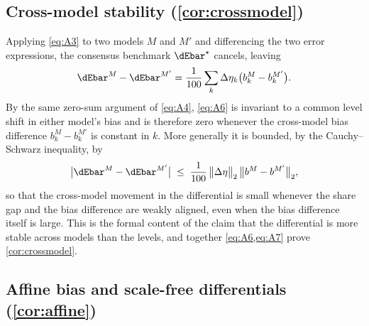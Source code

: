 \subsection{Cross-model stability (\texorpdfstring{\cref{cor:crossmodel}}{Corollary 1})}

Applying \cref{eq:A3} to two models $M$ and $M'$ and differencing the two error expressions, the consensus benchmark $\dEbar^{\star}$ cancels, leaving
\begin{equation}\label{eq:A6}
\dEbar^{M} - \dEbar^{M'}
= \frac{1}{100} \sum_k \Delta\eta_k
\bigl(b^{M}_k - b^{M'}_k\bigr) .
\end{equation}
By the same zero-sum argument of \cref{eq:A4}, \cref{eq:A6} is invariant to a common level shift in either model's bias and is therefore zero whenever the cross-model bias difference $b^{M}_k - b^{M'}_k$ is constant in $k$. More generally it is bounded, by the Cauchy--Schwarz inequality, by
\begin{equation}\label{eq:A7}
\bigl| \dEbar^{M} - \dEbar^{M'} \bigr|
\;\le\;
\frac{1}{100}\,
\bigl\lVert \Delta\eta \bigr\rVert_2\,
\bigl\lVert b^{M} - b^{M'} \bigr\rVert_2 ,
\end{equation}
so that the cross-model movement in the differential is small whenever the share gap and the bias difference are weakly aligned, even when the bias difference itself is large. This is the formal content of the claim that the differential is more stable across models than the levels, and together \cref{eq:A6,eq:A7} prove \cref{cor:crossmodel}.

\subsection{Affine bias and scale-free differentials (\texorpdfstring{\cref{cor:affine}}{Corollary 2})}


